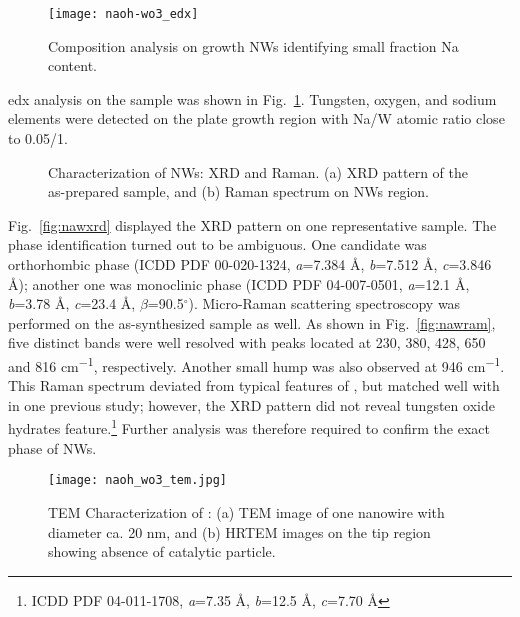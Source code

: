 \begin{figure}[htb]
\centering
\texttt{[image: naoh-wo3\_edx]}
\caption[Composition analysis on   growth NWs]{Composition analysis on   growth NWs identifying small fraction Na content.}
\label{fig:naohwedx}
\end{figure}
\gls{edx} analysis on the   sample was shown in Fig.~\ref{fig:naohwedx}. Tungsten, oxygen, and sodium elements were detected on the plate growth region with Na/W atomic ratio close to 0.05/1. 
\begin{figure}[htb]
\centering
{}\hspace{0.04\textwidth}
\caption[Characterization of   NWs: XRD and Raman]{Characterization of   NWs: XRD and Raman. (a) XRD pattern of the as-prepared sample, and (b) Raman spectrum on NWs region.}
\label{fig:naohwxrd}
\end{figure}
Fig.~\ref{fig:nawxrd} displayed the XRD pattern on one representative sample. The phase identification turned out to be ambiguous. One candidate was orthorhombic  phase (ICDD PDF 00-020-1324, \emph{a}=7.384 \si{\angstrom}, \emph{b}=7.512 \si{\angstrom}, \emph{c}=3.846 \si{\angstrom}); another one was monoclinic  phase (ICDD PDF 04-007-0501, \emph{a}=12.1 \si{\angstrom}, \emph{b}=3.78 \si{\angstrom}, \emph{c}=23.4 \si{\angstrom}, $\beta$=90.5$^\circ$). Micro-Raman scattering spectroscopy was performed on the as-synthesized sample as well. As shown in Fig.~\ref{fig:nawram}, five distinct bands were well resolved with peaks located at 230, 380, 428, 650 and 816 \si{cm^{-1}}, respectively. Another small hump was also observed at 946 \si{cm^{-1}}. This Raman spectrum deviated from typical features of ,\cite{Salje1975a,Dixit1986} but matched well with  in one previous study;\cite{Daniel1987} however, the XRD pattern did not reveal tungsten oxide hydrates feature.\footnote{ICDD PDF 04-011-1708, \emph{a}=7.35 \si{\angstrom}, \emph{b}=12.5 \si{\angstrom}, \emph{c}=7.70 \si{\angstrom}} Further analysis was therefore required to confirm the exact phase of   NWs.\cite{Azimirad2009a} 

\begin{figure}[htb]
\centering
\texttt{[image: naoh\_wo3\_tem.jpg]}
\caption[Characterization of  : TEM]{TEM Characterization of  : (a) TEM image of one nanowire with diameter ca. 20 nm, and (b) HRTEM images on the tip region showing absence of catalytic particle.}
\label{fig:naohwtem}
\end{figure}

